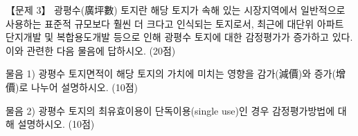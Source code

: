 \begin{longquestion}{【문제 3】}
광평수(廣坪數) 토지란 해당 토지가 속해 있는 시장지역에서 일반적으로 사용하는 표준적 규모보다 훨씬 더 크다고 인식되는 토지로서, 최근에 대단위 아파트 단지개발 및 복합용도개발 등으로 인해 광평수 토지에 대한 감정평가가 증가하고 있다. 이와 관련한 다음 물음에 답하시오. (20점) \par
\medskip\noindent 물음 1) 광평수 토지면적이 해당 토지의 가치에 미치는 영향을 감가(減價)와 증가(增價)로 나누어 설명하시오. (10점) \par
\medskip\noindent 물음 2) 광평수 토지의 최유효이용이 단독이용(single use)인 경우 감정평가방법에 대해 설명하시오. (10점) \par
\end{longquestion}
